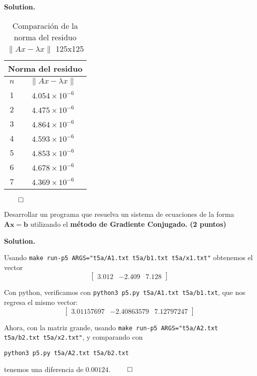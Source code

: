 \documentclass{article}
\theoremstyle{problemstyle}
\newenvironment{solution}{%
  \begin{mdframed}[linewidth=0.8pt,linecolor=Gray,backgroundcolor=Gray!5,roundcorner=5pt]%
  \noindent\textbf{Solution.}%
}{%
\hfill $ \qed $ 
  \end{mdframed}%
}
\begin{document}
\begin{solution}
\begin{table}[H]
    \begin{center}
        \begin{tabular}{|c|c|}
            \multicolumn{2}{c}{Norma del residuo} \\
            \hline
            $n$ & $\lVert Ax - \lambda x \rVert$ \\
            \hline
            1 & $4.054 \times 10^{-6}$ \\
            \hline
            2 & $4.475 \times 10^{-6}$ \\
            \hline
            3 & $4.864 \times 10^{-6}$ \\
            \hline
            4 & $4.593 \times 10^{-6}$ \\
            \hline
            5 & $4.853 \times 10^{-6}$ \\
            \hline
            6 & $4.678 \times 10^{-6}$ \\
            \hline
            7 & $4.369 \times 10^{-6}$ \\
            \hline
        \end{tabular}
    \end{center}
    \caption{Comparaci\'on de la norma del residuo $\lVert Ax - \lambda x \rVert$ 125x125}\label{tab:residual_norms_small5}
\end{table}



\end{solution}

\begin{problem}
Desarrollar un programa que resuelva un sistema de ecuaciones de la forma
$\mathbf{Ax} = \mathbf{b}$ utilizando el \textbf{m\'etodo de Gradiente
	Conjugado. (2 puntos)}
\end{problem}
\begin{solution}
  
  Usando \texttt{make run-p5 ARGS="t5a/A1.txt t5a/b1.txt t5a/x1.txt"} obtenemos el vector
  $$ \begin{bmatrix}
    3.012 & -2.409 & 7.128
\end{bmatrix} $$ 


Con python, verificamos con \texttt{python3 p5.py t5a/A1.txt t5a/b1.txt}, que nos regresa el mismo vector:
  $$ \begin{bmatrix}
    3.01157697& -2.40863579& 7.12797247
\end{bmatrix} $$

Ahora, con la matriz grande, usando \texttt{make run-p5 ARGS="t5a/A2.txt t5a/b2.txt t5a/x2.txt"}, y comparando con
\begin{center}
  \texttt{python3 p5.py t5a/A2.txt t5a/b2.txt}
\end{center}
tenemos una diferencia de $ 0.00124 $.
\end{solution}
\end{document}
